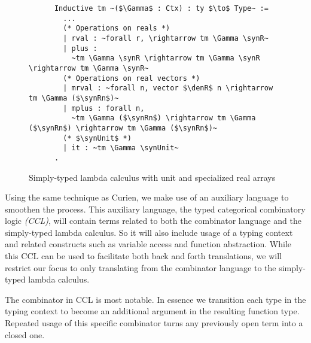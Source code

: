   \begin{figure}
    \centering
    \begin{verbatim}
      Inductive tm ~($\Gamma$ : Ctx) : ty $\to$ Type~ :=
        ...
        (* Operations on reals *)
        | rval : ~forall r, \rightarrow tm \Gamma \synR~
        | plus :
          ~tm \Gamma \synR \rightarrow tm \Gamma \synR \rightarrow tm \Gamma \synR~
        (* Operations on real vectors *)
        | mrval : ~forall n, vector $\denR$ n \rightarrow tm \Gamma ($\synRn$)~
        | mplus : forall n,
          ~tm \Gamma ($\synRn$) \rightarrow tm \Gamma ($\synRn$) \rightarrow tm \Gamma ($\synRn$)~
        (* $\synUnit$ *)
        | it : ~tm \Gamma \synUnit~
      .
    \end{verbatim}
    \caption{Simply-typed lambda calculus with unit and specialized real arrays}
    \label{fig:stlc_combinator}
  \end{figure}

  Using the same technique as Curien\cite{10.1007/3-540-15198-2_10}, we make use of an auxiliary language to smoothen the process.
  This auxiliary language, the typed categorical combinatory logic \textit{(CCL)}, will contain terms related to both the combinator language and the simply-typed lambda calculus.
  So it will also include usage of a typing context and related constructs such as variable access and function abstraction.
  While this CCL can be used to facilitate both back and forth translations, we will restrict our focus to only translating from the combinator language to the simply-typed lambda calculus.

  The \cclenv{} combinator in CCL is most notable.
  In essence we transition each type in the typing context to become an additional argument in the resulting function type.
  Repeated usage of this specific combinator turns any previously open term into a closed one.

